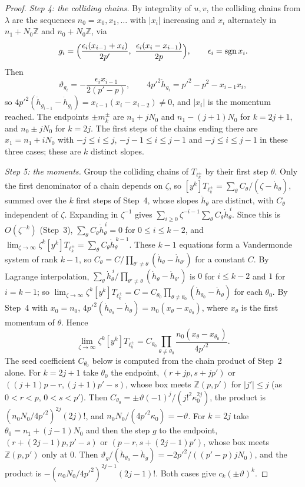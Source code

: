 \documentclass[twoside,10pt]{article}
\numberwithin{equation}{section}
\theoremstyle{slbody}
\theoremstyle{definition}
\theoremstyle{remark}
\begin{document}
\begin{proof}
\emph{Step 4: the colliding chains.}  By integrality of \(u,v\), the colliding
chains from \(\lambda\) are the sequences \(n_0=x_0,x_1,\dots\) with
\(|x_i|\) increasing and \(x_i\) alternately in \(n_1+N_0\mathbb Z\) and
\(n_0+N_0\mathbb Z\), via
\[
 g_i=\Bigl(\frac{\epsilon_i(x_{i-1}+x_i)}{2p'},\
          \frac{\epsilon_i(x_i-x_{i-1})}{2p}\Bigr),
 \qquad \epsilon_i=\operatorname{sgn}x_i.
\]
Then
\[
 \vartheta_{g_i}=-\frac{\epsilon_ix_{i-1}}{2(p'-p)},\qquad
 4p'^2\dot h_{g_i}=p'^2-p^2-x_{i-1}x_i,
\]
so \(4p'^2(\dot h_{g_{i-1}}-\dot h_{g_i})=x_{i-1}(x_i-x_{i-2})\neq0\), and
\(|x_i|\) is the momentum reached.  The endpoints \(\pm m^\pm_k\) are
\(n_1+jN_0\) and \(n_1-(j+1)N_0\) for \(k=2j+1\), and \(n_0\pm jN_0\) for
\(k=2j\).  The first steps of the chains ending there are \(x_1=n_1+iN_0\)
with \(-j\leq i\leq j\), \(-j-1\leq i\leq j-1\) and \(-j\leq i\leq j-1\) in
these three cases; these are \(k\) distinct slopes.

\emph{Step 5: the moments.}  Group the colliding chains of
\(T_{\ell^\pm_k}\) by their first step \(\theta\).  Only the first
denominator of a chain depends on \(\zeta\), so
\([y^k]T_{\ell^\pm_k}=\sum_\theta C_\theta/(\zeta-\dot h_\theta)\), summed
over the \(k\) first steps of Step~4, whose slopes \(\dot h_\theta\) are
distinct, with \(C_\theta\) independent of \(\zeta\).  Expanding in
\(\zeta^{-1}\) gives
\(\sum_{i\geq0}\zeta^{-i-1}\sum_\theta C_\theta\dot h_\theta^{\,i}\).  Since
this is \(O(\zeta^{-k})\) (Step~3), \(\sum_\theta C_\theta\dot h_\theta^{\,i}=0\)
for \(0\leq i\leq k-2\), and
\(\lim_{\zeta\to\infty}\zeta^k[y^k]T_{\ell^\pm_k}
=\sum_\theta C_\theta\dot h_\theta^{\,k-1}\).  These \(k-1\) equations form a
Vandermonde system of rank \(k-1\), so
\(C_\theta=C/\prod_{\theta'\neq\theta}(\dot h_\theta-\dot h_{\theta'})\) for a
constant \(C\).  By Lagrange interpolation,
\(\sum_\theta\dot h_\theta^{\,i}/\prod_{\theta'\neq\theta}(\dot h_\theta-\dot h_{\theta'})\)
is \(0\) for \(i\leq k-2\) and \(1\) for \(i=k-1\); so
\(\lim_{\zeta\to\infty}\zeta^k[y^k]T_{\ell^\pm_k}
=C=C_{\theta_0}\prod_{\theta\neq\theta_0}(\dot h_{\theta_0}-\dot h_\theta)\)
for each \(\theta_0\).  By Step~4 with \(x_0=n_0\),
\(4p'^2(\dot h_{\theta_0}-\dot h_\theta)=n_0(x_\theta-x_{\theta_0})\), where
\(x_\theta\) is the first momentum of \(\theta\).  Hence
\[
 \lim_{\zeta\to\infty}\zeta^k[y^k]T_{\ell^\pm_k}
 =C_{\theta_0}\prod_{\theta\neq\theta_0}\frac{n_0(x_\theta-x_{\theta_0})}{4p'^2}.
\]
The seed coefficient \(C_{\theta_0}\) below is computed from the chain
product of Step~2 alone.  For \(k=2j+1\) take \(\theta_0\) the endpoint,
\((r+jp,s+jp')\) or
\(((j+1)p-r,(j+1)p'-s)\), whose box meets \(\mathbb Z(p,p')\) for
\(|j'|\leq j\) (as \(0<r<p\), \(0<s<p'\)).  Then
\(C_{\theta_0}=\pm\vartheta(-1)^j/(j!^2\kappa_0^{2j})\), the product is
\((n_0N_0/4p'^2)^{2j}(2j)!\), and \(n_0N_0/(4p'^2\kappa_0)=-\vartheta\).  For
\(k=2j\) take \(\theta_0=n_1+(j-1)N_0\) and then the step \(g\) to the endpoint,
\((r+(2j-1)p,p'-s)\) or \((p-r,s+(2j-1)p')\), whose box meets
\(\mathbb Z(p,p')\) only at \(0\).  Then
\(\vartheta_g/(\dot h_{\theta_0}-\dot h_g)=-2p'^2/((p'-p)jN_0)\), and the product is
\(-(n_0N_0/4p'^2)^{2j-1}(2j-1)!\).  Both cases give \(c_k(\pm\vartheta)^k\).
\end{proof}
\end{document}
